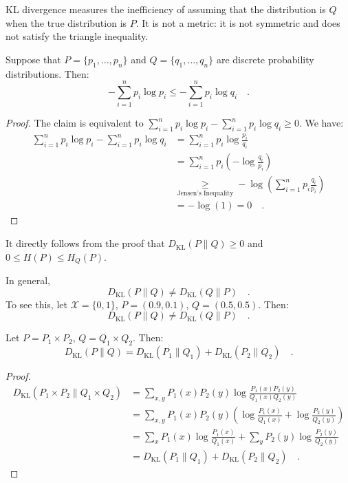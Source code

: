 \documentclass[../../main.tex]{subfiles}
\begin{document}
\begin{remark}
KL divergence measures the inefficiency of assuming that the distribution is \( Q \) when the true distribution is \( P \). It is not a metric: it is not symmetric and does not satisfy the triangle inequality.
\end{remark}

\begin{lemma}
    Suppose that $P = \{ p_1, \dots, p_n \}$ and $Q = \{ q_1, \dots, q_n \}$ are discrete probability distributions. Then:
    \[
        - \sum_{i = 1}^{n} p_i \log p_i \leq - \sum_{i = 1}^{n} p_i \log q_i \quad .
    \]
\end{lemma}
\begin{proof}
    The claim is equivalent to $\sum_{i = 1}^{n} p_i \log p_i - \sum_{i = 1}^{n} p_i \log q_i \geq 0$. We have:
    \begin{align*}
        \sum_{i = 1}^{n} p_i \log p_i - \sum_{i = 1}^{n} p_i \log q_i &= \sum_{i = 1}^{n} p_i \log \frac{p_i}{q_i} \\
        &= \sum_{i = 1}^{n} p_i \left( - \log \frac{q_i}{p_i} \right) \\
        &\underset{\text{Jensen's Inequality}}{\geq} - \log \left( \sum_{i = 1}^{n} p_i \frac{q_i}{p_i} \right) \\
        &= - \log(1) = 0 \quad .
    \end{align*}
\end{proof}

\begin{corollary}
    It directly follows from the proof that $D_{\mathrm{KL}}(P \| Q) \geq 0$ and $0 \leq H(P) \leq H_Q(P)$.
\end{corollary}

\begin{remark}[Asymmetry]
    In general,
    \[
        D_{\mathrm{KL}}(P \| Q) \neq D_{\mathrm{KL}}(Q \| P) \quad .
    \]
    To see this, let \( \mathcal{X} = \{0,1\} \), \( P = (0.9, 0.1) \), \( Q = (0.5, 0.5) \). Then:
    \[
        D_{\mathrm{KL}}(P \| Q) \neq D_{\mathrm{KL}}(Q \| P) \quad .
    \]
\end{remark}

\begin{proposition}[Additivity]
    Let \( P = P_1 \times P_2 \), \( Q = Q_1 \times Q_2 \). Then:
    \[
        D_{\mathrm{KL}}(P \| Q) = D_{\mathrm{KL}}(P_1 \| Q_1) + D_{\mathrm{KL}}(P_2 \| Q_2) \quad .
    \]
\end{proposition}
\begin{proof}
    \begin{align*}
        D_{\mathrm{KL}}(P_1 \times P_2 \| Q_1 \times Q_2)
        &= \sum_{x,y} P_1(x)P_2(y) \log \frac{P_1(x)P_2(y)}{Q_1(x)Q_2(y)} \\
        &= \sum_{x,y} P_1(x)P_2(y) \left( \log \frac{P_1(x)}{Q_1(x)} + \log \frac{P_2(y)}{Q_2(y)} \right) \\
        &= \sum_x P_1(x) \log \frac{P_1(x)}{Q_1(x)} + \sum_y P_2(y) \log \frac{P_2(y)}{Q_2(y)} \\
        &= D_{\mathrm{KL}}(P_1 \| Q_1) + D_{\mathrm{KL}}(P_2 \| Q_2) \quad .
    \end{align*}
\end{proof}
\end{document}
